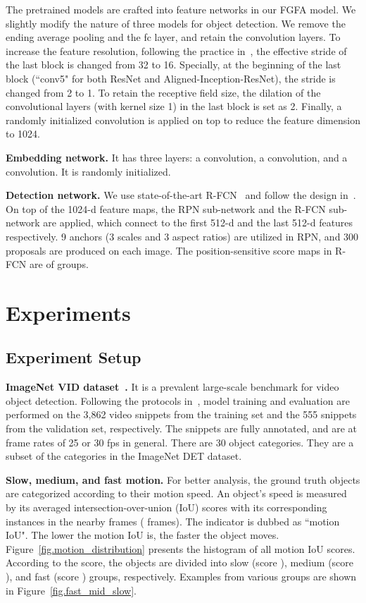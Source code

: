 \documentclass[10pt,twocolumn,letterpaper]{article}
\begin{document}
The pretrained models are crafted into feature networks in our FGFA model. We slightly modify the nature of three models for object detection. We remove the ending average pooling and the fc layer, and retain the convolution layers. To increase the feature resolution, following the practice in~\cite{chen2014semantic,dai2016rfcn}, the effective stride of the last block is changed from 32 to 16. Specially, at the beginning of the last block (``conv5" for both ResNet and Aligned-Inception-ResNet), the stride is changed from 2 to 1. To retain the receptive field size, the dilation of the convolutional layers (with kernel size  1) in the last block is set as 2. Finally, a randomly initialized  convolution is applied on top to reduce the feature dimension to 1024.

\textbf{Embedding network.} It has three layers: a  convolution, a  convolution, and a  convolution. It is randomly initialized.

\textbf{Detection network.} We use state-of-the-art R-FCN~\cite{dai2016rfcn} and follow the design in~\cite{zhu2016dff}. On top of the 1024-d feature maps, the RPN sub-network and the R-FCN sub-network are applied, which connect to the first 512-d and the last 512-d features respectively.  9 anchors (3 scales and 3 aspect ratios) are utilized in RPN, and 300 proposals are produced on each image. The position-sensitive score maps in R-FCN are of  groups.


\section{Experiments}

\subsection{Experiment Setup}

\textbf{ImageNet VID dataset~\cite{russakovsky2015imagenet}.} It is a prevalent large-scale benchmark for video object detection. Following the protocols in~\cite{kang2016tcnn,lee2016multi}, model training and evaluation are performed on the 3,862 video snippets from the training set and the 555 snippets from the validation set, respectively. The snippets are fully annotated, and are at frame rates of 25 or 30 fps in general. There are 30 object categories. They are a subset of the categories in the ImageNet DET dataset.

\textbf{Slow, medium, and fast motion.} For better analysis, the ground truth objects are categorized according to their motion speed. An object's speed is measured by its averaged intersection-over-union (IoU) scores with its corresponding instances in the nearby frames ( frames). The indicator is dubbed as ``motion IoU". The lower the motion IoU is, the faster the object moves. Figure~\ref{fig.motion_distribution} presents the histogram of all motion IoU scores. According to the score, the objects are divided into slow (score ), medium (score ), and fast (score ) groups, respectively. Examples from various groups are shown in Figure~\ref{fig.fast_mid_slow}.
\end{document}
